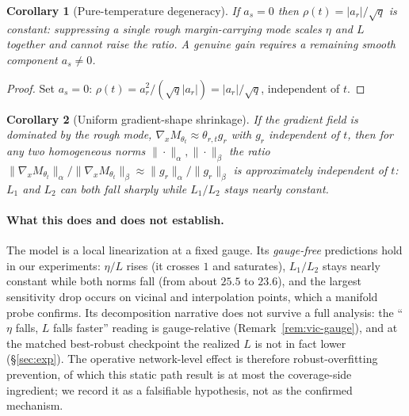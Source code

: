 \documentclass{article}
\newtheorem{corollary}{Corollary}
\theoremstyle{definition}
\begin{document}
\begin{corollary}[Pure-temperature degeneracy]\label{cor:vic-temp}
If $a_s=0$ then $\rho(t)=|a_r|/\sqrt q$ is constant: suppressing a single rough margin-carrying mode scales $\eta$ and $L$ together and cannot raise the ratio. A genuine gain requires a remaining smooth component $a_s\neq0$.
\end{corollary}
\begin{proof}
Set $a_s=0$: $\rho(t)=a_r^2/(\sqrt q|a_r|)=|a_r|/\sqrt q$, independent of $t$.
\end{proof}

\begin{corollary}[Uniform gradient-shape shrinkage]\label{cor:vic-shape}
If the gradient field is dominated by the rough mode, $\nabla_xM_{\theta_t}\approx\theta_{r,t}g_r$ with $g_r$ independent of $t$, then for any two homogeneous norms $\|\cdot\|_\alpha,\|\cdot\|_\beta$ the ratio $\|\nabla_xM_{\theta_t}\|_\alpha/\|\nabla_xM_{\theta_t}\|_\beta\approx\|g_r\|_\alpha/\|g_r\|_\beta$ is approximately independent of $t$: $L_1$ and $L_2$ can both fall sharply while $L_1/L_2$ stays nearly constant.
\end{corollary}

\paragraph{What this does and does not establish.} The model is a local linearization at a fixed gauge. Its \emph{gauge-free} predictions hold in our experiments: $\eta/L$ rises (it crosses $1$ and saturates), $L_1/L_2$ stays nearly constant while both norms fall (from about $25.5$ to $23.6$), and the largest sensitivity drop occurs on vicinal and interpolation points, which a manifold probe confirms. Its decomposition narrative does not survive a full analysis: the ``$\eta$ falls, $L$ falls faster'' reading is gauge-relative (Remark~\ref{rem:vic-gauge}), and at the matched best-robust checkpoint the realized $L$ is not in fact lower (\S\ref{sec:exp}). The operative network-level effect is therefore robust-overfitting prevention, of which this static path result is at most the coverage-side ingredient; we record it as a falsifiable hypothesis, not as the confirmed mechanism.
\end{document}
